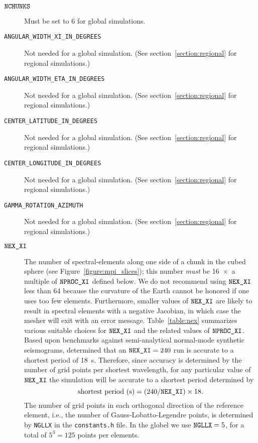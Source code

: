 \documentclass[onecolumn]{article}
\newcommand{\nexxi}{\mbox{\texttt{NEX\_XI}}}
\newcommand{\nprocxi}{\mbox{\texttt{NPROC\_XI}}}
\newcommand{\nchunks}{\mbox{\texttt{NCHUNKS}}}
\begin{document}
\begin{description}
\item[$\nchunks$] Must be set to 6 for global simulations.
\item[\texttt{ANGULAR\_WIDTH\_XI\_IN\_DEGREES}] Not needed for a global simulation.
(See section~\ref{section:regional} for regional simulations.)
\item[\texttt{ANGULAR\_WIDTH\_ETA\_IN\_DEGREES}] Not needed for a global simulation.
(See section~\ref{section:regional} for regional simulations.)
\item[\texttt{CENTER\_LATITUDE\_IN\_DEGREES}] Not needed for a global simulation.
(See section~\ref{section:regional} for regional simulations.)
\item[\texttt{CENTER\_LONGITUDE\_IN\_DEGREES}] Not needed for a global simulation.
(See section~\ref{section:regional} for regional simulations.)
\item[\texttt{GAMMA\_ROTATION\_AZIMUTH}] Not needed for a global simulation.
(See section~\ref{section:regional} for regional simulations.)
\item[$\nexxi$] The number of spectral-elements along one side of a
chunk in the cubed sphere (see Figure~\ref{figure:mpi_slices}); this
number \textit{must} be 16~$\times$~a multiple of $\nprocxi$ defined below.
We do not recommend using $\nexxi$ less than 64 because
the curvature of the Earth cannot be honored if one uses too few elements.
Furthermore, smaller values of $\nexxi$ are likely to result in spectral
elements with a negative Jacobian, in which case the mesher will exit with
an error message.
Table~\ref{table:nex} summarizes various suitable choices for
$\nexxi$ and the related values of $\nprocxi$.
Based upon benchmarks against semi-analytical
normal-mode synthetic seismograms,
\cite{KoTr02a,KoTr02b} determined that an $\nexxi=240$ run is accurate to
a shortest period of 18~s.
Therefore,
since accuracy is determined by the number of grid points per shortest
wavelength,
for any particular value of $\nexxi$ the simulation will be accurate
to a shortest period determined by
\begin{equation}
\mbox{shortest period (s)} = (240/\nexxi)\times 18.
\label{eq:shortest_period}
\end{equation}
The number of grid points in each orthogonal direction of the
reference element, i.e., the number of Gauss-Lobatto-Legendre points,
is determined by \texttt{NGLLX} in the \texttt{constants.h} file.
In the globel we use $\mbox{\texttt{NGLLX}}=5$, for a total of $5^3=125$
points per elements.

\end{description}
\end{document}
